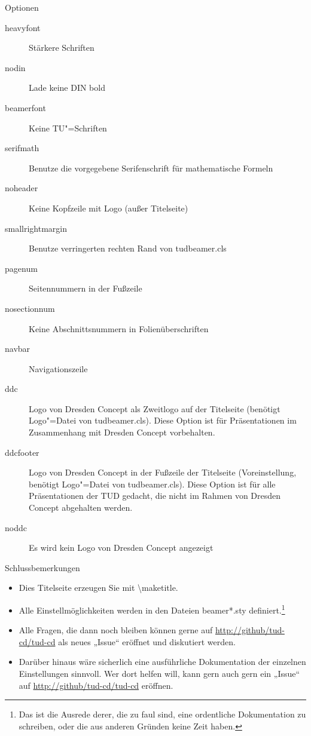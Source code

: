 \begin{frame}[allowframebreaks]{Optionen}
  \begin{description}
    \item[heavyfont] Stärkere Schriften
    \item[nodin] Lade keine {\dinfamily DIN bold}
    \item[beamerfont] Keine TU"=Schriften
    \item[serifmath] Benutze die vorgegebene Serifenschrift für mathematische Formeln
    \item[noheader] Keine Kopfzeile mit Logo (außer Titelseite)
    \item[smallrightmargin] Benutze verringerten rechten Rand von tudbeamer.cls
    \item[pagenum] Seitennummern in der Fußzeile
    \item[nosectionnum] Keine Abschnittsnummern in Folienüberschriften
    \item[navbar] Navigationszeile
    \item[ddc] Logo von Dresden Concept als Zweitlogo auf der
      Titelseite (benötigt Logo"=Datei von tudbeamer.cls). Diese
      Option ist für Präsentationen im Zusammenhang mit Dresden
      Concept vorbehalten.
    \item[ddcfooter] Logo von Dresden Concept in der Fußzeile der
      Titelseite (Voreinstellung, benötigt Logo"=Datei von
      tudbeamer.cls). Diese Option ist für alle Präsentationen der TUD
      gedacht, die nicht im Rahmen von Dresden Concept abgehalten
      werden.
    \item[noddc] Es wird kein Logo von Dresden Concept angezeigt
  \end{description}
\end{frame}



\begin{frame}{Schlussbemerkungen}
  \begin{itemize}
  \item Dies Titelseite erzeugen Sie mit \textbackslash maketitle.
  \item Alle Einstellmöglichkeiten werden in den Dateien beamer*.sty
    definiert.\footnote{Das ist die Ausrede derer, die zu faul sind,
      eine ordentliche Dokumentation zu schreiben, oder die aus anderen Gründen keine Zeit haben.}
  \item Alle Fragen, die dann noch bleiben können gerne auf \url{http://github/tud-cd/tud-cd} als neues „Issue“ eröffnet und diskutiert werden.
  \item Darüber hinaus wäre sicherlich eine ausführliche Dokumentation der einzelnen Einstellungen sinnvoll. Wer dort helfen will, kann gern auch gern ein „Issue“ auf \url{http://github/tud-cd/tud-cd} eröffnen.
  \end{itemize}
\end{frame}


